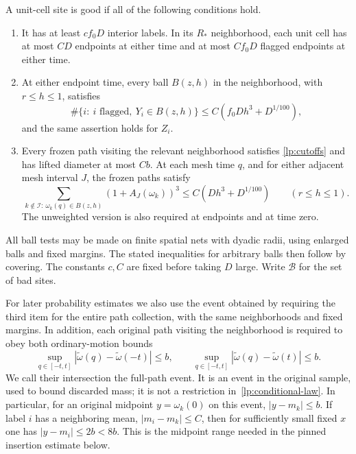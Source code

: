 \begin{definition}\label{lp:certificate}
A unit-cell site is good if all of the following conditions hold.
\begin{enumerate}
\item It has at least $c f_0D$ interior labels.  In its $R_*$
neighborhood, each unit cell has at most $CD$ endpoints at either
time and at most $Cf_0D$ flagged endpoints at either time.
\item At either endpoint time, every ball $B(z,h)$ in the neighborhood,
with $r\leq h\leq1$, satisfies
\begin{equation}\label{lp:flagged-count}
 \#\{i:\ i\text{ flagged},\ Y_i\in B(z,h)\}
 \leq C(f_0Dh^3+D^{1/100}),
\end{equation}
and the same assertion holds for $Z_i$.
\item Every frozen path visiting the relevant neighborhood satisfies
\eqref{lp:cutoffs} and has lifted diameter at most $Cb$.  At each mesh
time $q$, and for either adjacent mesh interval $J$, the frozen paths
satisfy
\begin{equation}\label{lp:frozen-count}
 \sum_{k\notin\mathcal I:\ \omega_k(q)\in B(z,h)}
        (1+A_J(\omega_k))^3
 \leq C(Dh^3+D^{1/100})\qquad(r\leq h\leq1).
\end{equation}
The unweighted version is also required at endpoints and at time zero.
\end{enumerate}
All ball tests may be made on finite spatial nets with dyadic radii,
using enlarged balls and fixed margins.  The stated inequalities for
arbitrary balls then follow by covering.  The constants $c,C$ are
fixed before taking $D$ large.  Write $\mathcal B$ for the set of bad sites.
\end{definition}

For later probability estimates we also use the event obtained by
requiring the third item for the entire path collection, with the
same neighborhoods and fixed margins.  In addition, each original path
visiting the neighborhood is required to obey both ordinary-motion bounds
\begin{equation}\label{lp:ordinary-motion}
 \sup_{q\in[-t,t]}|\widetilde\omega(q)-\widetilde\omega(-t)|\le b,
 \qquad
 \sup_{q\in[-t,t]}|\widetilde\omega(q)-\widetilde\omega(t)|\le b.
\end{equation}
We call their intersection the full-path event.  It is an event in the
original sample, used to bound discarded mass; it is not a restriction
in~\eqref{lp:conditional-law}.  In particular, for an original midpoint
$y=\omega_k(0)$ on this event, $|y-m_k|\le b$.  If label $i$ has a
neighboring mean, $|m_i-m_k|\le C$, then for sufficiently small fixed
$x$ one has $|y-m_i|\le2b<8b$.  This is the midpoint range needed in
the pinned insertion estimate below.


